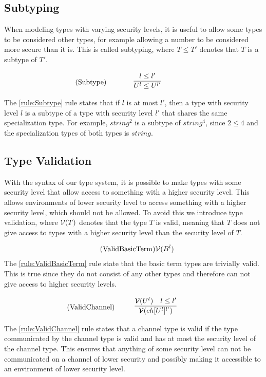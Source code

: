 \subsection{Subtyping}
When modeling types with varying security levels, it is useful to allow some types to be considered other types, for example allowing a number to be considered more secure than it is.
This is called subtyping, where $T\leq T'$ denotes that $T$ is a subtype of $T'$. 

\begin{align*}
\tag{Subtype}\label{rule:Subtype} &\infrule{l\leq l'}{U^l\leq U^{l'}}
\end{align*}
The \ref{rule:Subtype} rule states that if $l$ is at most $l'$, then a type with security level $l$ is a subtype of a type with security level $l'$ that shares the same specialization type.
For example, $string^2$ is a subtype of $string^4$, since $2\leq4$ and the specialization types of both types is $string$.

\subsection{Type Validation}
With the syntax of our type system, it is possible to make types with some security level that allow access to something with a higher security level.
This allows environments of lower security level to access something with a higher security level, which should not be allowed.
To avoid this we introduce type validation, where $\mathcal{V}(T)$ denotes that the type $T$ is valid, meaning that $T$ does not give access to types with a higher security level than the security level of $T$.

\begin{align*}
\tag{ValidBasicTerm}\label{rule:ValidBasicTerm} &\mathcal{V}(B^l)
\end{align*}
The \ref{rule:ValidBasicTerm} rule state that the basic term types are trivially valid.
This is true since they do not consist of any other types and therefore can not give access to higher security levels.

\begin{align*}
\tag{ValidChannel}\label{rule:ValidChannel} &\infrule{\valid{U^l}\quad l\leq l'}{\valid{ch[U^l]^{l'}}}
\end{align*}
The \ref{rule:ValidChannel} rule states that a channel type is valid if the type communicated by the channel type is valid and has at most the security level of the channel type.
This ensures that anything of some security level can not be communicated on a channel of lower security and possibly making it accessible to an environment of lower security level.

